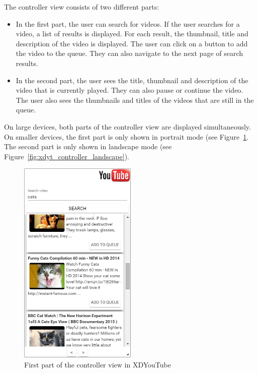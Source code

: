 The controller view consists of two different parts:
\begin{itemize}
	\item In the first part, the user can search for videos. If the user searches for a video, a list of results is displayed. For each result, the thumbnail, title and description of the video is displayed. The user can click on a button to add the video to the queue. They can also navigate to the next page of search results.
	\item In the second part, the user sees the title, thumbnail and description of the video that is currently played. They can also pause or continue the video. The user also sees the thumbnails and titles of the videos that are still in the queue. 
\end{itemize}

On large devices, both parts of the controller view are displayed simultaneously. On smaller devices, the first part is only shown in portrait mode (see Figure~\ref{fig:xdyt_controller_portrait}. The second part is only shown in landscape mode (see Figure~\ref{fig:xdyt_controller_landscape}).

\begin{figure}[H]
  \centering
    \includegraphics[width=0.5\textwidth]{images/screenshots/xdyt/controller_portrait.png}
	\caption[Screenshot XDYouTube: Controller view (first part)]{First part of the controller view in XDYouTube}
	\label{fig:xdyt_controller_portrait}
\end{figure}

